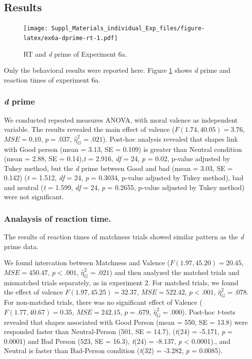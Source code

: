 \documentclass[
  english,
  man]{apa6}
\begin{document}
\hypertarget{results-9}{%
\subsection{Results}\label{results-9}}

\begin{figure}
\centering
\texttt{[image: Suppl\_Materials\_individual\_Exp\_files/figure-latex/ex6a-dprime-rt-1.pdf]}
\caption{\label{fig:ex6a-dprime-rt}RT and \emph{d} prime of Experiment 6a.}
\end{figure}

Only the behavioral results were reported here. Figure \ref{fig:ex6a-dprime-rt} shows \emph{d} prime and reaction times of experiment 6a.

\hypertarget{d-prime-7}{%
\subsubsection{\texorpdfstring{\emph{d} prime}{d prime}}\label{d-prime-7}}

We conducted repeated measures ANOVA, with moral valence as independent variable. The results revealed the main effect of valence (\(F(1.74, 40.05) = 3.76\), \(\mathit{MSE} = 0.10\), \(p = .037\), \(\hat{\eta}^2_G = .021\)). Post-hoc analysis revealed that shapes link with Good person (mean = 3.13, SE = 0.109) is greater than Neutral condition (mean = 2.88, SE = 0.14),\emph{t} = 2.916, \emph{df} = 24, \emph{p} = 0.02, p-value adjusted by Tukey method, but the \emph{d} prime between Good and bad (mean = 3.03, SE = 0.142) (\emph{t} = 1.512, \emph{df} = 24, \emph{p} = 0.3034, p-value adjusted by Tukey method), bad and neutral (\emph{t} = 1.599, \emph{df} = 24, \emph{p} = 0.2655, p-value adjusted by Tukey method) were not significant.

\hypertarget{analaysis-of-reaction-time.}{%
\subsubsection{Analaysis of reaction time.}\label{analaysis-of-reaction-time.}}

The results of reaction times of matchness trials showed similar pattern as the \emph{d} prime data.

We found intercation between Matchness and Valence (\(F(1.97, 45.20) = 20.45\), \(\mathit{MSE} = 450.47\), \(p < .001\), \(\hat{\eta}^2_G = .021\)) and then analyzed the matched trials and mismatched trials separately, as in experiment 2. For matched trials, we found the effect of valence \(F(1.97, 45.25) = 32.37\), \(\mathit{MSE} = 522.42\), \(p < .001\), \(\hat{\eta}^2_G = .078\). For non-matched trials, there was no significant effect of Valence (\(F(1.77, 40.67) = 0.35\), \(\mathit{MSE} = 242.15\), \(p = .679\), \(\hat{\eta}^2_G = .000\)). Post-hoc \emph{t}-tests revealed that shapes associated with Good Person (mean = 550, SE = 13.8) were responded faster than Neutral-Person (501, SE = 14.7), (\emph{t}(24) = -5.171, \emph{p} = 0.0001) and Bad Person (523, SE = 16.3), \emph{t}(24) = -8.137, \emph{p} \textless{} 0.0001)., and Neutral is faster than Bad-Person condition (\emph{t}(32) = -3.282, \emph{p} = 0.0085).
\end{document}
